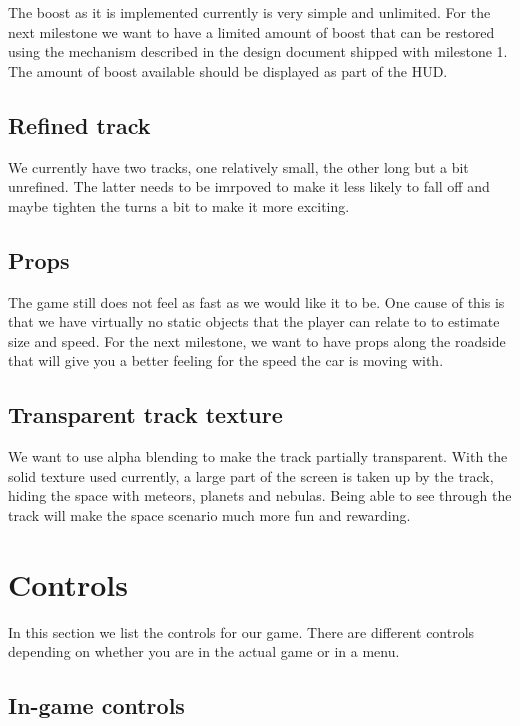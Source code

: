 \documentclass[11pt]{article}
\begin{document}
The boost as it is implemented currently is very simple and unlimited. For the next milestone we want to have a limited amount of boost that can be restored using the mechanism described in the design document shipped with milestone 1. The amount of boost available should be displayed as part of the HUD. 

\subsection{Refined track}

We currently have two tracks, one relatively small, the other long but a bit unrefined. The latter needs to be imrpoved to make it less likely to fall off and maybe tighten the turns a bit to make it more exciting.

\subsection{Props}

The game still does not feel as fast as we would like it to be. One cause of this is that we have virtually no static objects that the player can relate to to estimate size and speed. For the next milestone, we want to have props along the roadside that will give you a better feeling for the speed the car is moving with.

\subsection{Transparent track texture}

We want to use alpha blending to make the track partially transparent. With the solid texture used currently, a large part of the screen is taken up by the track, hiding the space with meteors, planets and nebulas. Being able to see through the track will make the space scenario much more fun and rewarding.

\appendix

\section{Controls}
\label{controls}

In this section we list the controls for our game. There are different controls
depending on whether you are in the actual game or in a menu. 

\subsection{In-game controls}
\end{document}
